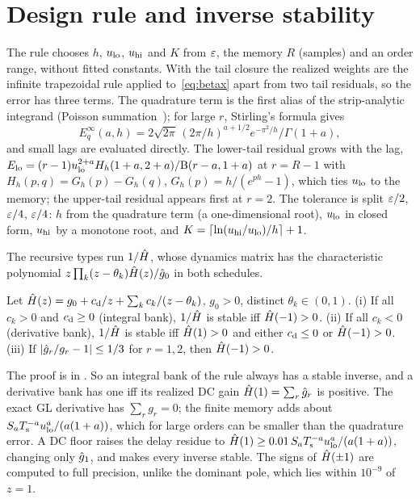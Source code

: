 \section{Design rule and inverse stability}\label{sec:design}

The rule chooses $h$, $u_{\mathrm{lo}}$, $u_{\mathrm{hi}}$ and $K$ from $\varepsilon$, the memory $R$ (samples) and an order range, without fitted constants. With the tail closure the realized weights are the infinite trapezoidal rule applied to~\eqref{eq:betax} apart from two tail residuals, so the error has three terms. The quadrature term is the first alias of the strip-analytic integrand (Poisson summation~\cite{trefethen2014}); for large $r$, Stirling's formula gives
\begin{equation}
E_q^{\infty}(a,h)=2\sqrt{2\pi}\,(2\pi/h)^{a+1/2}e^{-\pi^2/h}/\Gamma(1+a),\label{eq:Eq}
\end{equation}
and small lags are evaluated directly. The lower-tail residual grows with the lag, $E_{\mathrm{lo}}=(r-1)u_{\mathrm{lo}}^{2+a}H_h(1+a,2+a)/\mathrm{B}(r-a,1+a)$ at $r=R-1$ with $H_h(p,q)=G_h(p)-G_h(q)$, $G_h(p)=h/(e^{ph}-1)$, which ties $u_{\mathrm{lo}}$ to the memory; the upper-tail residual appears first at $r=2$. The tolerance is split $\varepsilon/2$, $\varepsilon/4$, $\varepsilon/4$: $h$ from the quadrature term (a one-dimensional root), $u_{\mathrm{lo}}$ in closed form, $u_{\mathrm{hi}}$ by a monotone root, and $K=\lceil\ln(u_{\mathrm{hi}}/u_{\mathrm{lo}})/h\rceil+1$.

The recursive types run $1/\hat H$, whose dynamics matrix has the characteristic polynomial $z\prod_k(z-\theta_k)\hat H(z)/\hat g_0$ in both schedules.

\begin{proposition}\label{prop:stability}
Let $\hat H(z)=g_0+c_{\mathrm{d}}/z+\sum_kc_k/(z-\theta_k)$, $g_0>0$, distinct $\theta_k\in(0,1)$. (i) If all $c_k>0$ and $c_{\mathrm{d}}\ge0$ (integral bank), $1/\hat H$ is stable iff $\hat H(-1)>0$. (ii) If all $c_k<0$ (derivative bank), $1/\hat H$ is stable iff $\hat H(1)>0$ and either $c_{\mathrm{d}}\le0$ or $\hat H(-1)>0$. (iii) If $|\hat g_r/g_r-1|\le1/3$ for $r=1,2$, then $\hat H(-1)>0$.
\end{proposition}

The proof is in . So an integral bank of the rule always has a stable inverse, and a derivative bank has one iff its realized DC gain $\hat H(1)=\sum_r\hat g_r$ is positive. The exact GL derivative has $\sum_rg_r=0$; the finite memory adds about $S_aT_{\mathrm{s}}^{-a}u_{\mathrm{lo}}^{a}/(a(1+a))$, which for large orders can be smaller than the quadrature error. A DC floor raises the delay residue to $\hat H(1)\ge0.01\,S_aT_{\mathrm{s}}^{-a}u_{\mathrm{lo}}^a/(a(1+a))$, changing only $\hat g_1$, and makes every inverse stable. The signs of $\hat H(\pm1)$ are computed to full precision, unlike the dominant pole, which lies within $10^{-9}$ of $z=1$.

